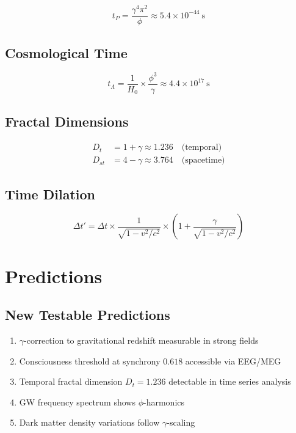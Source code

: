 \documentclass[12pt,a4paper]{article}
\begin{document}
\begin{equation}
t_P = \frac{\gamma^4 \pi^2}{\phi} \approx 5.4 \times 10^{-44}~\text{s}
\end{equation}

\subsection{Cosmological Time}

\begin{equation}
t_\Lambda = \frac{1}{H_0} \times \frac{\phi^3}{\gamma} \approx 4.4 \times 10^{17}~\text{s}
\end{equation}

\subsection{Fractal Dimensions}

\begin{align}
D_t &= 1 + \gamma \approx 1.236 \quad \text{(temporal)} \\
D_{st} &= 4 - \gamma \approx 3.764 \quad \text{(spacetime)}
\end{align}

\subsection{Time Dilation}

\begin{equation}
\Delta t' = \Delta t \times \frac{1}{\sqrt{1 - v^2/c^2}} \times \left(1 + \frac{\gamma}{\sqrt{1 - v^2/c^2}}\right)
\end{equation}

\section{Predictions}

\subsection{New Testable Predictions}

\begin{enumerate}
\item $\gamma$-correction to gravitational redshift measurable in strong fields
\item Consciousness threshold at synchrony $0.618$ accessible via EEG/MEG
\item Temporal fractal dimension $D_t = 1.236$ detectable in time series analysis
\item GW frequency spectrum shows $\phi$-harmonics
\item Dark matter density variations follow $\gamma$-scaling
\end{enumerate}
\end{document}
